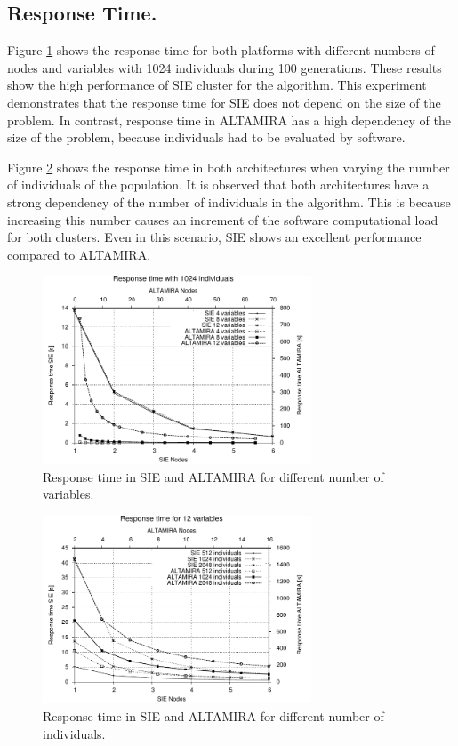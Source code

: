 \documentclass{sig-alternate}
\begin{document}
\subsection{Response Time.}
Figure \ref{fig:rt_vars} shows the response time for both platforms with different numbers of nodes and variables with 1024 individuals during 100 generations. These results show the high performance of SIE cluster for the algorithm. This experiment demonstrates that the response time for SIE does not depend on the size of the problem. In contrast, response time in ALTAMIRA has a high dependency of the size of the problem, because individuals had to be evaluated by software.


Figure \ref{fig:rt_indv} shows the response time in both architectures when varying the number of individuals of the population. It is observed that both architectures have a strong dependency of the number of individuals in the algorithm. This is because increasing this number causes an increment of the software computational load for both clusters. Even in this scenario, SIE shows an excellent performance compared to ALTAMIRA.



\begin{figure}[h!]
\begin{center}
\includegraphics[width=8cm]{./images/response_time_1024indiv} 
\end{center}
\caption{Response time in SIE and ALTAMIRA for different number of variables.}
\label{fig:rt_vars}
\end{figure}

\begin{figure}[h!]
\begin{center} 
\includegraphics[width=8cm]{./images/response_time_12var} 
\end{center}
\caption{Response time in SIE and ALTAMIRA for different number of individuals.}
\label{fig:rt_indv}
\end{figure}
\end{document}
